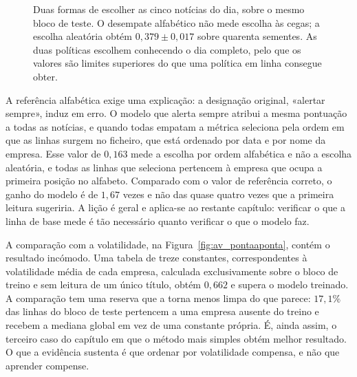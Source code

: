 \begin{figure}[ht]
\centering
{}
\caption[O desempate alfabético não é uma referência aleatória]{Duas formas de escolher as cinco
notícias do dia, sobre o mesmo bloco de teste. O desempate alfabético não mede escolha às cegas;
a escolha aleatória obtém $0{,}379 \pm 0{,}017$ sobre
quarenta sementes. As duas políticas escolhem conhecendo o dia completo, pelo que os valores são
limites superiores do que uma política em linha consegue obter.}
\label{fig:av_orcamento}
\end{figure}

A referência alfabética exige uma explicação: a designação original, «alertar sempre», induz em erro. O modelo que
alerta sempre atribui a mesma pontuação a todas as notícias, e quando todas empatam a métrica
seleciona pela ordem em que as linhas surgem no ficheiro, que está ordenado por data e por nome da
empresa. Esse valor de $0{,}163$ mede a escolha por ordem alfabética e não a escolha aleatória, e
todas as linhas que seleciona pertencem à empresa que ocupa a primeira posição no alfabeto. Comparado
com o valor de referência correto, o ganho do modelo é de $1{,}67$ vezes e não das quase quatro vezes
que a primeira leitura sugeriria. A lição é geral e aplica-se ao restante capítulo: verificar o que a
linha de base mede é tão necessário quanto verificar o que o modelo faz.

A comparação com a volatilidade, na Figura~\ref{fig:av_pontaaponta}, contém o resultado incómodo. Uma tabela de treze constantes,
correspondentes à volatilidade média de cada empresa, calculada exclusivamente sobre o bloco de
treino e sem leitura de um único título, obtém $0{,}662$ e supera o modelo treinado. A comparação
tem uma reserva que a torna menos limpa do que parece: $17{,}1\%$ das linhas do bloco de teste
pertencem a uma empresa ausente do treino e recebem a mediana global em vez de uma constante
própria. É, ainda assim, o terceiro caso do capítulo em que o método mais simples obtém melhor
resultado. O que a evidência sustenta é
que ordenar por volatilidade compensa, e não que aprender compense.

